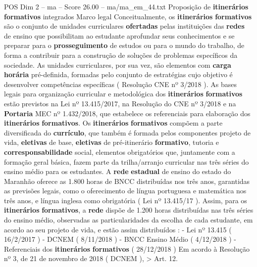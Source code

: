 \begin{textsample}{POS Dim 2 – ma – Score 26.00 – ma/ma\_em\_44.txt}  \label{ex:f2_pos_059}
Proposição de \textbf{itinerários} \textbf{formativos} integrados Marco legal Conceitualmente, os \textbf{itinerários} \textbf{formativos} são o conjunto de unidades curriculares \textbf{ofertadas} pelas instituições das \textbf{redes} de ensino que possibilitam ao estudante aprofundar seus conhecimentos e se preparar para o \textbf{prosseguimento} de estudos ou para o mundo do trabalho, de forma a contribuir para a construção de soluções de problemas específicos da sociedade.
As unidades curriculares, por sua vez, são elementos com \textbf{carga} \textbf{horária} pré-definida, formadas pelo conjunto de estratégias cujo objetivo é desenvolver competências específicas ( Resolução CNE nº 3/2018 ).
As bases legais para organização curricular e metodológica dos \textbf{itinerários} \textbf{formativos} estão previstos na Lei nº 13.415/2017, na Resolução do CNE nº 3/2018 e na \textbf{Portaria} MEC nº 1.432/2018, que estabelece os referenciais para elaboração dos \textbf{itinerários} \textbf{formativos}.
Os \textbf{itinerários} \textbf{formativos} compõem a parte diversificada do \textbf{currículo}, que também é formada pelos componentes projeto de vida, \textbf{eletivas} de base, \textbf{eletivas} de pré-itinerário \textbf{formativo}, tutoria e \textbf{corresponsabilidade} social, elementos obrigatórios que, juntamente com a formação geral básica, fazem parte da trilha/arranjo curricular nas três séries do ensino médio para os estudantes.
A \textbf{rede} \textbf{estadual} de ensino do estado do Maranhão oferece as 1.800 horas de BNCC distribuídas nos três anos, garantidas as previsões legais, como o oferecimento de língua portuguesa e matemática nos três anos, e língua inglesa como obrigatória ( Lei nº 13.415/17 ).
Assim, para os \textbf{itinerários} \textbf{formativos}, a \textbf{rede} dispõe de 1.200 horas distribuídas nas três séries do ensino médio, observadas as particularidades da escolha de cada estudante, em acordo ao seu projeto de vida, e estão assim distribuídos : - Lei nº 13.415 ( 16/2/2017 ) - DCNEM ( 8/11/2018 ) - BNCC Ensino Médio ( 4/12/2018 ) - Referenciais dos \textbf{itinerários} \textbf{formativos} ( 28/12/2018 ) Em acordo à Resolução nº 3, de 21 de novembro de 2018 ( DCNEM ), > Art. 12.

\end{textsample}
